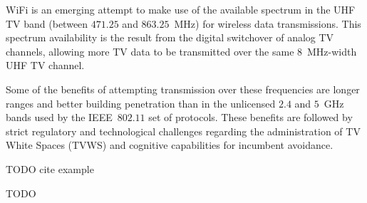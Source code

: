 WiFi is an emerging attempt to make use of the available spectrum in the UHF TV band (between $471.25$ and $863.25$~MHz) for wireless data transmissions. This spectrum availability is the result from the digital switchover of analog TV channels, allowing more TV data to be transmitted over the same $8$~MHz-width UHF TV channel.

Some of the benefits of attempting transmission over these frequencies are longer ranges and better building penetration than in the unlicensed $2.4$ and $5$~GHz bands used by the IEEE~$802.11$ set of protocols. These benefits are followed by strict regulatory and technological challenges regarding the administration of TV White Spaces (TVWS) and cognitive capabilities for incumbent avoidance.

TODO cite example~\cite{tobagi1987mpa}


TODO
